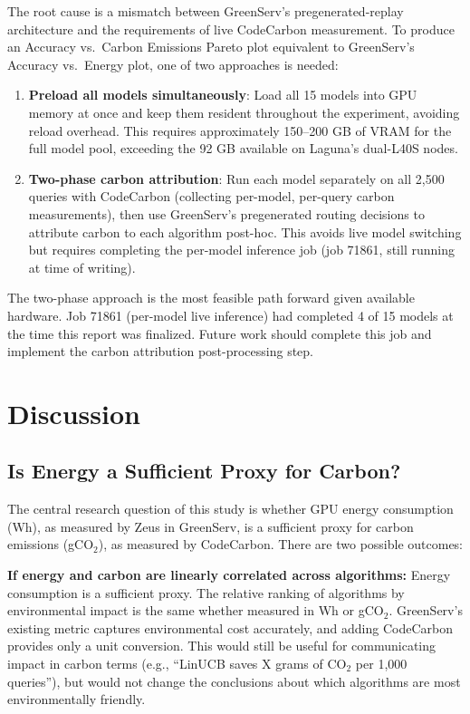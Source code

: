 \documentclass[12pt]{article}
\begin{document}
The root cause is a mismatch between GreenServ's pregenerated-replay
architecture and the requirements of live CodeCarbon measurement. To produce
an Accuracy vs.\ Carbon Emissions Pareto plot equivalent to GreenServ's
Accuracy vs.\ Energy plot, one of two approaches is needed:

\begin{enumerate}
\item \textbf{Preload all models simultaneously}: Load all 15 models into
GPU memory at once and keep them resident throughout the experiment, avoiding
reload overhead. This requires approximately 150--200 GB of VRAM for the
full model pool, exceeding the 92 GB available on Laguna's dual-L40S nodes.

\item \textbf{Two-phase carbon attribution}: Run each model separately on
all 2,500 queries with CodeCarbon (collecting per-model, per-query carbon
measurements), then use GreenServ's pregenerated routing decisions to
attribute carbon to each algorithm post-hoc. This avoids live model
switching but requires completing the per-model inference job (job 71861,
still running at time of writing).
\end{enumerate}

The two-phase approach is the most feasible path forward given available
hardware. Job 71861 (per-model live inference) had completed 4 of 15 models
at the time this report was finalized. Future work should complete this job
and implement the carbon attribution post-processing step.

\section{Discussion}

\subsection{Is Energy a Sufficient Proxy for Carbon?}

The central research question of this study is whether GPU energy
consumption (Wh), as measured by Zeus in GreenServ, is a sufficient proxy
for carbon emissions (gCO$_2$), as measured by CodeCarbon. There are two
possible outcomes:

\textbf{If energy and carbon are linearly correlated across algorithms:}
Energy consumption is a sufficient proxy. The relative ranking of algorithms
by environmental impact is the same whether measured in Wh or gCO$_2$.
GreenServ's existing metric captures environmental cost accurately, and
adding CodeCarbon provides only a unit conversion. This would still be
useful for communicating impact in carbon terms (e.g., ``LinUCB saves X
grams of CO$_2$ per 1,000 queries''), but would not change the conclusions
about which algorithms are most environmentally friendly.
\end{document}
